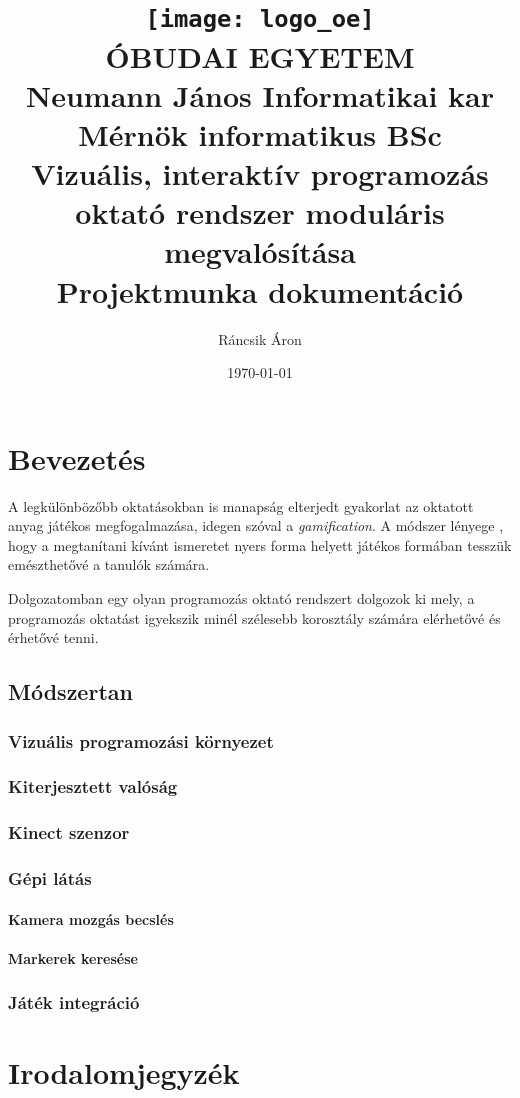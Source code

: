\documentclass[12pt,a4paper,oneside]{report} %
\title{%
	\texttt{[image: logo\_oe]}\\
	ÓBUDAI EGYETEM\\
	Neumann János Informatikai kar\\
	Mérnök informatikus BSc\\
	\vfill
	\large \textbf{Vizuális, interaktív programozás oktató rendszer moduláris megvalósítása\\}
	\large Projektmunka dokumentáció
	\vfill
}
\author{Ráncsik Áron}
\date{\today}
\begin{document}
\begin{titlepage}
\maketitle
\thispagestyle{empty}
\end{titlepage}


\newpage
\tableofcontents
\newpage


\chapter{Bevezetés}
\par 
A legkülönbözőbb oktatásokban is manapság elterjedt\cite{riar2020game} gyakorlat az oktatott anyag játékos megfogalmazása, idegen szóval a \cite{Deterding2011} \textit{gamification}. A módszer lényege , hogy a megtanítani kívánt ismeretet nyers forma helyett játékos formában tesszük emészthetővé a tanulók számára. 
\par 
Dolgozatomban egy olyan programozás oktató rendszert dolgozok ki mely, a programozás oktatást igyekszik minél szélesebb korosztály számára elérhetővé és érhetővé tenni.
\section{Módszertan}
\subsection{Vizuális programozási környezet}
\subsection{Kiterjesztett valóság}
\subsection{Kinect szenzor}
\subsection{Gépi látás}
\subsubsection{Kamera mozgás becslés}
\subsubsection{Markerek keresése}
\subsection{Játék integráció}


\newpage
\chapter*{Irodalomjegyzék}
\printbibliography[heading=none]
\newpage
\listoffigures
{}
\end{document}
